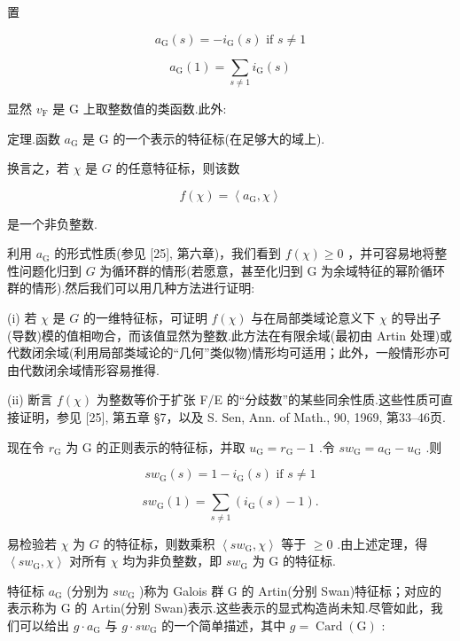 \documentclass[10pt]{article}
\begin{document}
置

\[
{a}_{\mathrm{G}}\left( s\right)  =  - {i}_{\mathrm{G}}\left( s\right) \text{ if }s \neq  1
\]

\[
{a}_{\mathrm{G}}\left( 1\right)  = \mathop{\sum }\limits_{{s \neq  1}}{i}_{\mathrm{G}}\left( s\right)
\]

显然 \({v}_{\mathrm{F}}\) 是 \(\mathrm{G}\) 上取整数值的类函数.此外:

定理.函数 \({a}_{\mathrm{G}}\) 是 \(\mathrm{G}\) 的一个表示的特征标(在足够大的域上).

换言之，若 \(\chi\) 是 \(G\) 的任意特征标，则该数

\[
f\left( \chi \right)  = \left\langle  {{a}_{\mathrm{G}},\chi }\right\rangle
\]

是一个非负整数.

利用 \({a}_{\mathrm{G}}\) 的形式性质(参见 [25], 第六章)，我们看到 \(f\left( \chi \right)  \geq  0\) ，并可容易地将整性问题化归到 \(G\) 为循环群的情形(若愿意，甚至化归到 G 为余域特征的幂阶循环群的情形).然后我们可以用几种方法进行证明:

(i) 若 \(\chi\) 是 \(G\) 的一维特征标，可证明 \(f\left( \chi \right)\) 与在局部类域论意义下 \(\chi\) 的导出子(导数)模的值相吻合，而该值显然为整数.此方法在有限余域(最初由 Artin 处理)或代数闭余域(利用局部类域论的“几何”类似物)情形均可适用；此外，一般情形亦可由代数闭余域情形容易推得.

(ii) 断言 \(f\left( \chi \right)\) 为整数等价于扩张 F/E 的“分歧数”的某些同余性质.这些性质可直接证明，参见 [25], 第五章 §7，以及 S. Sen, Ann. of Math., 90, 1969, 第33–46页.

现在令 \({r}_{\mathrm{G}}\) 为 \(\mathrm{G}\) 的正则表示的特征标，并取 \({u}_{\mathrm{G}} = {r}_{\mathrm{G}} - 1\) .令 \(s{w}_{\mathrm{G}} = {a}_{\mathrm{G}} - {u}_{\mathrm{G}}\) .则

\[
s{w}_{\mathrm{G}}\left( s\right)  = 1 - {i}_{\mathrm{G}}\left( s\right) \text{ if }s \neq  1
\]

\[
s{w}_{\mathrm{G}}\left( 1\right)  = \mathop{\sum }\limits_{{s \neq  1}}\left( {{i}_{\mathrm{G}}\left( s\right)  - 1}\right) .
\]

易检验若 \(\chi\) 为 \(G\) 的特征标，则数乘积 \(\left\langle  {s{w}_{\mathrm{G}},\chi }\right\rangle\) 等于 \(\geq  0\) .由上述定理，得 \(\left\langle  {s{w}_{\mathrm{G}},\chi }\right\rangle\) 对所有 \(\chi\) 均为非负整数，即 \(s{w}_{\mathrm{G}}\) 为 \(\mathrm{G}\) 的特征标.

特征标 \({a}_{\mathrm{G}}\) (分别为 \(s{w}_{\mathrm{G}}\) )称为 Galois 群 G 的 Artin(分别 Swan)特征标；对应的表示称为 G 的 Artin(分别 Swan)表示.这些表示的显式构造尚未知.尽管如此，我们可以给出 \(g \cdot  {a}_{\mathrm{G}}\) 与 \(g \cdot  s{w}_{\mathrm{G}}\) 的一个简单描述，其中 \(g = \operatorname{Card}\left( \mathrm{G}\right)\) :
\end{document}
